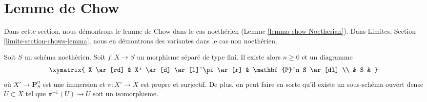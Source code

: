 \section{Lemme de Chow}
\label{section-chows-lemma}

\noindent
Dans cette section, nous démontrons le lemme de Chow dans le cas
noethérien (Lemme \ref{lemma-chow-Noetherian}).
Dans
Limites, Section \ref{limits-section-chows-lemma},
nous en démontrons des variantes dans le cas non noethérien.

\begin{lemma}
\label{lemma-chow-Noetherian}
\begin{reference}
\cite[II Theorem 5.6.1(a)]{EGA}
\end{reference}
Soit $S$ un schéma noethérien.
Soit $f : X \to S$ un morphisme séparé de type fini.
Il existe alors $n \geq 0$ et un diagramme
$$
\xymatrix{
X \ar[rd] & X' \ar[d] \ar[l]^\pi \ar[r] & \mathbf{P}^n_S \ar[dl] \\
& S &
}
$$
où $X' \to \mathbf{P}^n_S$ est une immersion et
$\pi : X' \to X$ est propre et surjectif. De plus, on peut
faire en sorte qu'il existe un sous-schéma ouvert dense
$U \subset X$ tel que $\pi^{-1}(U) \to U$ soit un isomorphisme.
\end{lemma}

